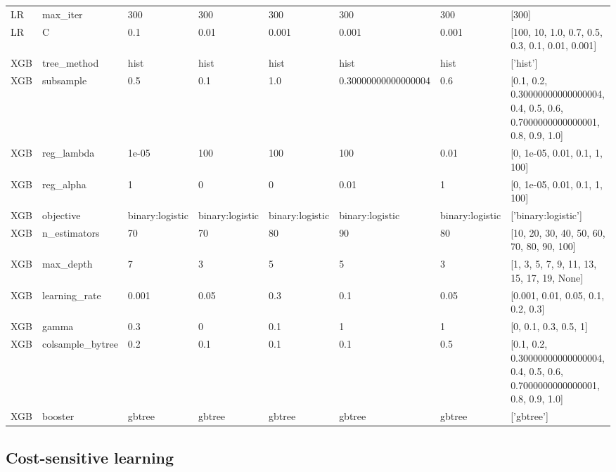 \documentclass[oneside, a4paper, onecolumn, 11pt]{article}
\begin{document}
\begin{refsection}
\begin{table}[]
\begin{tabular}{llllllll}
LR & max\_iter & 300 & 300 & 300 & 300 & 300 & {[}300{]} \\
LR & C & 0.1 & 0.01 & 0.001 & 0.001 & 0.001 & {[}100, 10, 1.0, 0.7, 0.5, 0.3, 0.1, 0.01, 0.001{]} \\ \hline
XGB & tree\_method & hist & hist & hist & hist & hist & {[}'hist'{]} \\
XGB & subsample & 0.5 & 0.1 & 1.0 & 0.30000000000000004 & 0.6 & {[}0.1, 0.2, 0.30000000000000004, 0.4, 0.5, 0.6, 0.7000000000000001, 0.8, 0.9, 1.0{]} \\
XGB & reg\_lambda & 1e-05 & 100 & 100 & 100 & 0.01 & {[}0, 1e-05, 0.01, 0.1, 1, 100{]} \\
XGB & reg\_alpha & 1 & 0 & 0 & 0.01 & 1 & {[}0, 1e-05, 0.01, 0.1, 1, 100{]} \\
XGB & objective & binary:logistic & binary:logistic & binary:logistic & binary:logistic & binary:logistic & {[}'binary:logistic'{]} \\
XGB & n\_estimators & 70 & 70 & 80 & 90 & 80 & {[}10, 20, 30, 40, 50, 60, 70, 80, 90, 100{]} \\
XGB & max\_depth & 7 & 3 & 5 & 5 & 3 & {[}1, 3, 5, 7, 9, 11, 13, 15, 17, 19, None{]} \\
XGB & learning\_rate & 0.001 & 0.05 & 0.3 & 0.1 & 0.05 & {[}0.001, 0.01, 0.05, 0.1, 0.2, 0.3{]} \\
XGB & gamma & 0.3 & 0 & 0.1 & 1 & 1 & {[}0, 0.1, 0.3, 0.5, 1{]} \\
XGB & colsample\_bytree & 0.2 & 0.1 & 0.1 & 0.1 & 0.5 & {[}0.1, 0.2, 0.30000000000000004, 0.4, 0.5, 0.6, 0.7000000000000001, 0.8, 0.9, 1.0{]} \\
XGB & booster & gbtree & gbtree & gbtree & gbtree & gbtree & {[}'gbtree'{]} \\ \hline
\end{tabular}
\end{table}



\subsection*{Cost-sensitive learning} \label{sec:SI_cost_sensitive}


\end{refsection}
\end{document}
